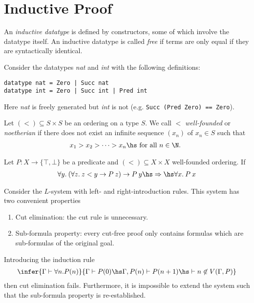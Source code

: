 \documentclass{article}
\begin{document}
\section{Inductive Proof}

\begin{definition}
    An \emph{inductive datatype} is defined by constructors, some of which involve the datatype 
    itself. An inductive datatype is called \emph{free} if terms are only equal if they are 
    syntactically identical.
\end{definition}

\begin{example}
    Consider the datatypes \emph{nat} and \emph{int} with the following definitions:
    \begin{verbatim}
datatype nat = Zero | Succ nat
datatype int = Zero | Succ int | Pred int
    \end{verbatim}
    Here \emph{nat} is freely generated but \emph{int} is not (e.g. \texttt{Succ (Pred Zero) == Zero}).
\end{example}

\begin{definition}
    Let $(<) \subseteq S\times S$ be an ordering on a type $S$. We call $<$ \emph{well-founded} or
    \emph{noetherian} if there does not exist an infinite sequence $(x_n)$ of $x_n\in S$ such that 
    \begin{align*}
        x_1 > x_2 > \cdots > x_n\hs\text{ for all $n\in\N$.  }
    \end{align*}
\end{definition}

\begin{theorem}
    Let $P:X\to\{\top,\bot\}$ be a predicate and $(<)\subseteq X\times X$ well-founded ordering.
    If
    \begin{align*}
        \forall y.\:(\forall z.\:z < y \to P\:z) \to P\:y
        \hs\Rightarrow\hs
        \forall x.\:P\:x
    \end{align*}
\end{theorem}

\begin{theorem}
    Consider the $L$-system with left- and right-introduction rules. This system has two
    convenient properties 
    \begin{enumerate}
        \item Cut elimination: the cut rule is unnecessary.
        \item Sub-formula property: every cut-free proof only contains formulas which are sub-formulas of the original goal.
    \end{enumerate}
    Introducing the induction rule 
    \begin{align*}
        \infer{\Gamma \vdash \forall n. P(n)}{\Gamma \vdash P(0) \hs \Gamma,P(n)\vdash P(n+1) \hs \vdash n\not\in V(\Gamma, P)}
    \end{align*}
    then cut elimination fails. Furthermore, it is impossible to extend the system such that 
    the sub-formula property is re-established.
\end{theorem}
\end{document}
